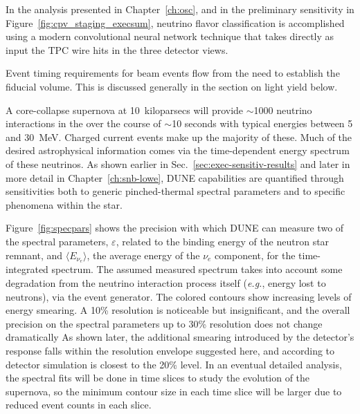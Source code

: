 In the analysis presented in Chapter~\ref{ch:osc}, and in
the preliminary  sensitivity in
Figure~\ref{fig:cpv_staging_execsum}, neutrino flavor classification
is accomplished using a modern convolutional neural network
technique that takes directly as input the TPC wire hits
in the three detector views.

Event timing requirements for beam events flow from the
need to establish the fiducial volume.  This is discussed
generally in the section on light yield below.

  A core-collapse
supernova at 10~kiloparsecs will provide $\sim$1000 neutrino
interactions in the  over the course of
$\sim$10 seconds with typical energies between 5 and 30~MeV.
Charged current \nue{} events make up the majority of these.
Much of the desired astrophysical information comes via the
time-dependent energy spectrum of these neutrinos.  As shown
earlier in Sec.~\ref{sec:exec-sensitiv-results} and later
in more detail in Chapter~\ref{ch:snb-lowe},
DUNE capabilities are quantified through sensitivities
both to generic pinched-thermal spectral parameters 
and to
specific phenomena within the star.

Figure~\ref{fig:specpars} shows the precision with which DUNE
can measure two of the spectral parameters, $\varepsilon$, related to
the binding energy of the neutron star remnant, and $\langle
E_{\nu_e}\rangle$, the average energy of the $\nu_e$ component, for the
time-integrated spectrum.
The assumed measured spectrum takes into account some degradation
from the neutrino interaction process itself 
({\em e.g.}, energy lost to neutrons), via the  event generator.
The colored contours show increasing levels of energy smearing.
A 10\% resolution is noticeable but insignificant, and the
overall precision on the spectral parameters up to 30\%
resolution does not change dramatically
As shown later,
the additional smearing introduced by the detector's response
falls within the resolution envelope suggested here, and according to
detector simulation is closest to the 20\% level.
In an eventual detailed analysis, the spectral
fits will be done in time slices to study the evolution of
the supernova, so the minimum contour size in each time slice
will be larger due to reduced event counts in each slice.


